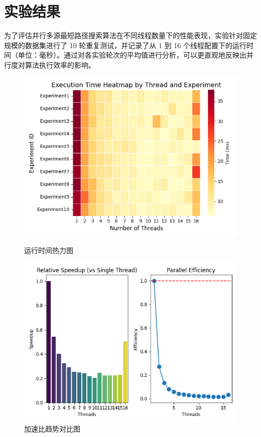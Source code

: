 \documentclass[a4paper, utf8]{ctexart}
\begin{document}
	\section{实验结果}
	
	为了评估并行多源最短路径搜索算法在不同线程数量下的性能表现，实验针对固定规模的数据集进行了 10 轮重复测试，并记录了从 1 到 16 个线程配置下的运行时间（单位：毫秒）。通过对各实验轮次的平均值进行分析，可以更直观地反映出并行度对算法执行效率的影响。
	
	\begin{figure}[htbp]
		\centering
		\begin{minipage}{.45\textwidth}
			\centering
			\includegraphics[width=.78\textwidth]{./figure/TimeHeatmap.png}
			\caption{运行时间热力图}
		\end{minipage}
		\begin{minipage}{.45\textwidth}
			\centering
			\includegraphics[width=.78\textwidth]{./figure/Speedup.png}
			\caption{加速比趋势对比图}
		\end{minipage}
	\end{figure}
	
\end{document}
